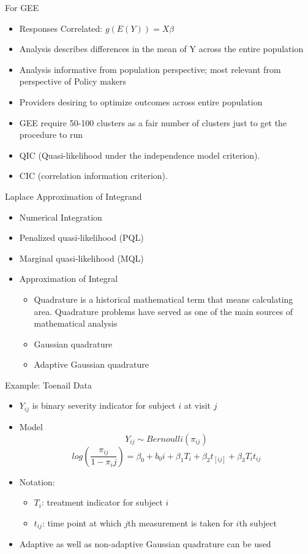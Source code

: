 \documentclass{beamer}
\begin{document}
\begin{frame}
For GEE
\begin{itemize}
\item Responses Correlated: $g(E(Y))=X\beta$ \vspace{0.25cm}
\item Analysis describes differences in the mean of Y across the entire population \vspace{0.25cm}
\item Analysis informative from population perspective; most relevant from perspective of Policy makers \vspace{0.25cm}
\item Providers desiring to optimize outcomes across entire population
\item GEE require 50-100 clusters as a fair number of clusters just to get the procedure to run 
\item QIC (Quasi-likelihood under the independence model criterion).  
\item CIC (correlation information criterion).
\end{itemize}
\end{frame}

\begin{frame}{Laplace Approximation of Integrand}
\begin{itemize}
	\item Numerical Integration 
	\item Penalized quasi-likelihood (PQL)
	\item Marginal quasi-likelihood (MQL)
	\item Approximation of Integral
	\begin{itemize}
		\item Quadrature is a historical mathematical term that means calculating area. Quadrature problems have served as one of the main sources of mathematical analysis
		\item Gaussian quadrature
		\item Adaptive Gaussian quadrature
	\end{itemize}
\end{itemize}
\end{frame}

\begin{frame}{Example: Toenail Data}
\begin{itemize}
\item $Y_{ij}$ is binary severity indicator for subject $i$ at visit $j$
\item Model
\[Y_{ij}\sim Bernoulli(\pi_{ij}) \]
\[log(\frac{\pi_{ij}}{1-\pi_ij})=\beta_0+b_0i+\beta_1T_i+\beta_2t_[ij]+ \beta_3T_it_{ij} \]
\item Notation:
\begin{itemize}
	\item $T_i$: treatment indicator for subject $i$
	\item $t_{ij}$: time point at which $j$th measurement is taken for $i$th subject
\end{itemize}
\item Adaptive as well as non-adaptive Gaussian quadrature can be used
\end{itemize}
\end{frame}
\end{document}
